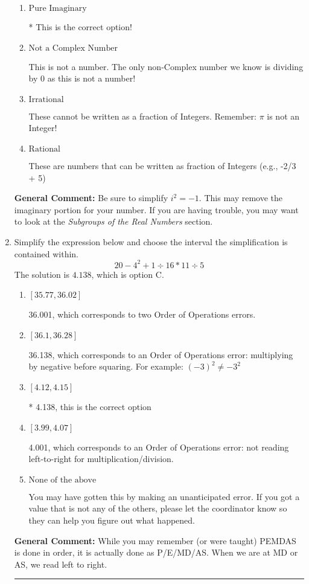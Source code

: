 \documentclass{extbook}[14pt]
\newcommand{\litem}[1]{\item #1

\rule{\textwidth}{0.4pt}}
\begin{document}
\begin{enumerate}
{\begin{enumerate}[label=\Alph*.]
This is a Complex number $(a+bi)$ that is not Real (has $i$ as part of the number).
\item \( \text{Pure Imaginary} \)

* This is the correct option!
\item \( \text{Not a Complex Number} \)

This is not a number. The only non-Complex number we know is dividing by 0 as this is not a number!
\item \( \text{Irrational} \)

These cannot be written as a fraction of Integers. Remember: $\pi$ is not an Integer!
\item \( \text{Rational} \)

These are numbers that can be written as fraction of Integers (e.g., -2/3 + 5)
\end{enumerate}

\textbf{General Comment:} Be sure to simplify $i^2 = -1$. This may remove the imaginary portion for your number. If you are having trouble, you may want to look at the \textit{Subgroups of the Real Numbers} section.
}
\litem{
Simplify the expression below and choose the interval the simplification is contained within.
\[ 20 - 4^2 + 1 \div 16 * 11 \div 5 \]The solution is \( 4.138 \), which is option C.\begin{enumerate}[label=\Alph*.]
\item \( [35.77, 36.02] \)

 36.001, which corresponds to two Order of Operations errors.
\item \( [36.1, 36.28] \)

 36.138, which corresponds to an Order of Operations error: multiplying by negative before squaring. For example: $(-3)^2 \neq -3^2$
\item \( [4.12, 4.15] \)

* 4.138, this is the correct option
\item \( [3.99, 4.07] \)

 4.001, which corresponds to an Order of Operations error: not reading left-to-right for multiplication/division.
\item \( \text{None of the above} \)

 You may have gotten this by making an unanticipated error. If you got a value that is not any of the others, please let the coordinator know so they can help you figure out what happened.
\end{enumerate}

\textbf{General Comment:} While you may remember (or were taught) PEMDAS is done in order, it is actually done as P/E/MD/AS. When we are at MD or AS, we read left to right.
}
\end{enumerate}
\end{document}
